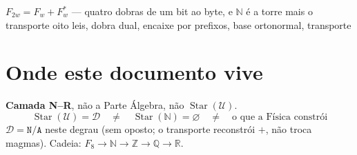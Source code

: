 \documentclass[11pt,a4paper]{article}
\newcommand{\code}[1]{\texttt{\small #1}}
\newcommand{\Word}{\mathcal{W}}
\newcommand{\FF}{\mathbb{F}}
\begin{document}
       {$F_{2w}=F_w+F_w^{*}$ --- quatro dobras de um bit ao byte,
        e $\mathbb{N}$ é a torre mais o transporte}
       {oito leis, dobra dual, encaixe por prefixos, base ortonormal, transporte}
\maketitle

\begin{abstract}
\textbf{Convenção, antes de tudo:} $\FF_2$ é o corpo de dois elementos e
\[
\boxed{\;F_w:=\mathrm{GF}(2^{w})\;}\qquad\text{logo}\qquad
F_1=\FF_2,\quad \lvert F_w\rvert=2^{w},\quad \lvert F_8\rvert=256 .
\]
O índice conta \textbf{bits}, nunca elementos --- e é o mesmo índice em todo o
documento.

\medskip \textbf{Primeiro degrau da construção.} Começa-se no bit e sobe-se:
o que aqui se entrega é o suporte sobre o qual o \code{inteiros.tex} irá
duplicar e quocientar ($\mathbb{N}^{2}/{\sim}=\mathbb{Z}$). Aqui duplica-se o
\textbf{corpo} e \textbf{não} se quocienta:
$F_{2w}=F_w\oplus\sigma F_w$ com $\sigma^{2}=\sigma+\lambda$. Partindo de
$F_1=\FF_2$ --- um bit, duas portas --- quatro andares dão
$F_1\to F_2\to F_4\to F_8$, de cardinais $2,4,16,256$; e o suporte do topo é
exactamente $\Word_8=\{0,\ldots,255\}$, o envelope do \code{inteiros.tex}
(§\ref{sec:encaixe}). A régua $\lambda_k$ não se escreve: deriva-se, e o
que a busca devolve é $2^{2^{k}-1}$ --- a régua do \emph{nim} de Conway
(§\ref{sec:conway}). A base dos produtos dos três geradores é
$e_k=2^{k}$ --- a base ortonormal das oito leis (§\ref{sec:base}). E o que separa
o corpo de $\mathbb{N}$ tem nome e conta-se: o \textbf{transporte}
(§\ref{sec:transporte}).
\end{abstract}

\section*{Onde este documento vive}

\noindent\textbf{Camada N--R}, não a Parte Álgebra, não \(\operatorname{Star}(\mathcal{U})\).
\[
\boxed{\;
\operatorname{Star}(\mathcal{U})=\mathcal{D}
\quad\neq\quad
\operatorname{Star}(\mathbb{N})=\varnothing
\quad\neq\quad
\text{o que a Física constrói}
\;}
\]
\(\mathcal{D}=\texttt{N/A}\) neste degrau (sem oposto; o transporte reconstrói \(+\), não troca magmas). Cadeia: \(F_8\to\mathbb{N}\to\mathbb{Z}\to\mathbb{Q}\to\mathbb{R}\).
\end{document}
